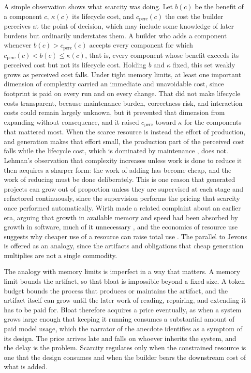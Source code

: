 \documentclass[11pt]{article}
\theoremstyle{remark}
\begin{document}
A simple observation shows what scarcity was doing. Let $b(c)$ be the benefit of a component $c$, $\kappa(c)$ its lifecycle cost, and $c_{\mathrm{perc}}(c)$ the cost the builder perceives at the point of decision, which may include some knowledge of later burdens but ordinarily understates them. A builder who adds a component whenever $b(c)>c_{\mathrm{perc}}(c)$ accepts every component for which $c_{\mathrm{perc}}(c)<b(c)\le\kappa(c)$, that is, every component whose benefit exceeds its perceived cost but not its lifecycle cost. Holding $b$ and $\kappa$ fixed, this set weakly grows as perceived cost falls. Under tight memory limits, at least one important dimension of complexity carried an immediate and unavoidable cost, since footprint is paid on every run and on every change. That did not make lifecycle costs transparent, because maintenance burden, correctness risk, and interaction costs could remain largely unknown, but it prevented that dimension from expanding without consequence, and it raised $c_{\mathrm{perc}}$ toward $\kappa$ for the components that mattered most. When the scarce resource is instead the effort of production, and generation makes that effort small, the production part of the perceived cost falls while the lifecycle cost, which is dominated by maintenance \cite{boehm1981,lehman1980}, does not. Lehman's observation that complexity increases unless work is done to reduce it then acquires a sharper form: the work of adding has become cheap, and the work of reducing must be done deliberately. This is one reason that generated projects can grow out of proportion unless they are supervised at each stage and refactored continuously, since the supervision performs the pricing that scarcity once performed automatically. Wirth made a related complaint about an earlier era, arguing that growth in available memory and speed had been absorbed by growth in software, much of it unnecessary \cite{wirth1995}, and the economics of resource use suggests why cheaper use of a resource can raise total use \cite{jevons1865}. The parallel to Jevons is offered as an analogy, since the artifacts and obligations that cheap generation multiplies are not a single commodity.

The analogy with memory limits is imperfect in a way that matters. A memory limit bounds the artifact, so that bloat is impossible beyond a fixed size. A token budget bounds the process that produces or maintains the artifact, and the artifact itself can grow until the later work of reading, repairing, and extending it has to be paid for. Bloat therefore acquires a price eventually, as when a system grows large enough that keeping it running consumes a substantial amount of paid model usage, which the narrator of the anecdote identifies as a symptom of its design. The price arrives late and falls on whoever inherits the system, and the delay is the problem. Scarcity regulates only when the constrained resource is one that the design consumes and when the builder bears the downstream cost of what is added.
\end{document}
